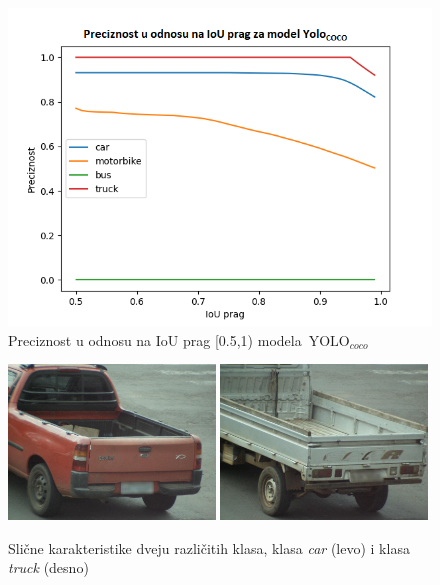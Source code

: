 \documentclass[12pt,oneside]{memoir}
\newcommand{\yolo}{\ensuremath{\,\textrm{YOLO}}}
\begin{document}
\begin{figure}[!ht]
    \centering
    \includegraphics[width=1\textwidth]{matfmaster/glava4/precision_vs_iou_threshold_yolo4.png}
    \caption{Preciznost u odnosu na IoU prag [0.5,1) modela $\yolo_{coco}$}
    \label{fig:YOLO4_COCO_prc}
\end{figure}


\begin{figure}[htbp]
    \centering
      \includegraphics[width=0.49\textwidth]{matfmaster/glava4/carproblem.jpg}
      \includegraphics[width=0.49\textwidth]{matfmaster/glava4/truckproblem.jpg}
    \caption{Slične karakteristike dveju različitih klasa, klasa \textit{car} (levo) i klasa \textit{truck} (desno) } \label{fig:YOLO4_COCO_car_vs_truck}
\end{figure}
\end{document}
